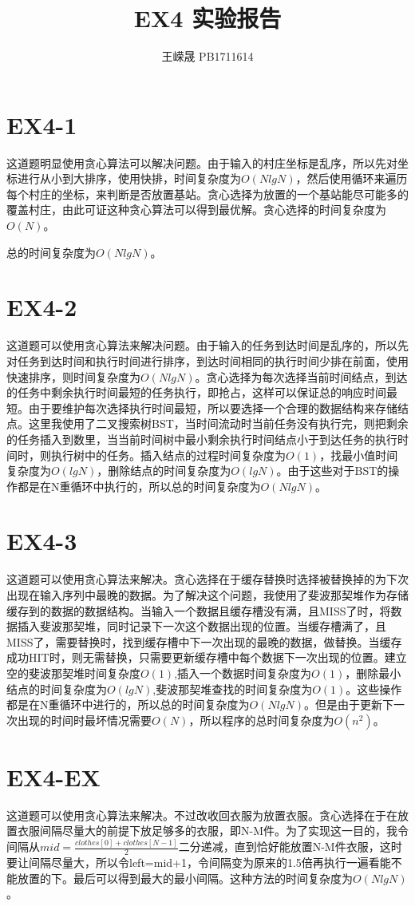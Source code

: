 \documentclass[11pt,a4paper]{article}
\title{EX4 实验报告}
\author{王嵘晟 \quad PB1711614}
\date{}
\begin{document}
	\maketitle
	\section*{EX4-1}
	\par{这道题明显使用贪心算法可以解决问题。由于输入的村庄坐标是乱序，所以先对坐标进行从小到大排序，使用快排，时间复杂度为$O(NlgN)$，然后使用循环来遍历每个村庄的坐标，来判断是否放置基站。贪心选择为放置的一个基站能尽可能多的覆盖村庄，由此可证这种贪心算法可以得到最优解。贪心选择的时间复杂度为$O(N)$。}
	\par{总的时间复杂度为$O(NlgN)$。}
	\section*{EX4-2}
	\par{这道题可以使用贪心算法来解决问题。由于输入的任务到达时间是乱序的，所以先对任务到达时间和执行时间进行排序，到达时间相同的执行时间少排在前面，使用快速排序，则时间复杂度为$O(NlgN)$。贪心选择为每次选择当前时间结点，到达的任务中剩余执行时间最短的任务执行，即抢占，这样可以保证总的响应时间最短。由于要维护每次选择执行时间最短，所以要选择一个合理的数据结构来存储结点。这里我使用了二叉搜索树BST，当时间流动时当前任务没有执行完，则把剩余的任务插入到数里，当当前时间树中最小剩余执行时间结点小于到达任务的执行时间时，则执行树中的任务。插入结点的过程时间复杂度为$O(1)$，找最小值时间复杂度为$O(lgN)$，删除结点的时间复杂度为$O(lgN)$。由于这些对于BST的操作都是在N重循环中执行的，所以总的时间复杂度为$O(NlgN)$。}
	\section*{EX4-3}
	\par{这道题可以使用贪心算法来解决。贪心选择在于缓存替换时选择被替换掉的为下次出现在输入序列中最晚的数据。为了解决这个问题，我使用了斐波那契堆作为存储缓存到的数据的数据结构。当输入一个数据且缓存槽没有满，且MISS了时，将数据插入斐波那契堆，同时记录下一次这个数据出现的位置。当缓存槽满了，且MISS了，需要替换时，找到缓存槽中下一次出现的最晚的数据，做替换。当缓存成功HIT时，则无需替换，只需要更新缓存槽中每个数据下一次出现的位置。建立空的斐波那契堆时间复杂度$O(1)$,插入一个数据时间复杂度为$O(1)$，删除最小结点的时间复杂度为$O(lgN)$,斐波那契堆查找的时间复杂度为$O(1)$。这些操作都是在N重循环中进行的，所以总的时间复杂度为$O(NlgN)$。但是由于更新下一次出现的时间时最坏情况需要$O(N)$，所以程序的总时间复杂度为$O(n^{2})$。}
	\section*{EX4-EX}
	\par{这道题可以使用贪心算法来解决。不过改收回衣服为放置衣服。贪心选择在于在放置衣服间隔尽量大的前提下放足够多的衣服，即N-M件。为了实现这一目的，我令间隔从$mid=\frac{clothes[0]+clothes[N-1]}{2}$二分递减，直到恰好能放置N-M件衣服，这时要让间隔尽量大，所以令left=mid+1，令间隔变为原来的1.5倍再执行一遍看能不能放置的下。最后可以得到最大的最小间隔。这种方法的时间复杂度为$O(NlgN)$。}
\end{document}
